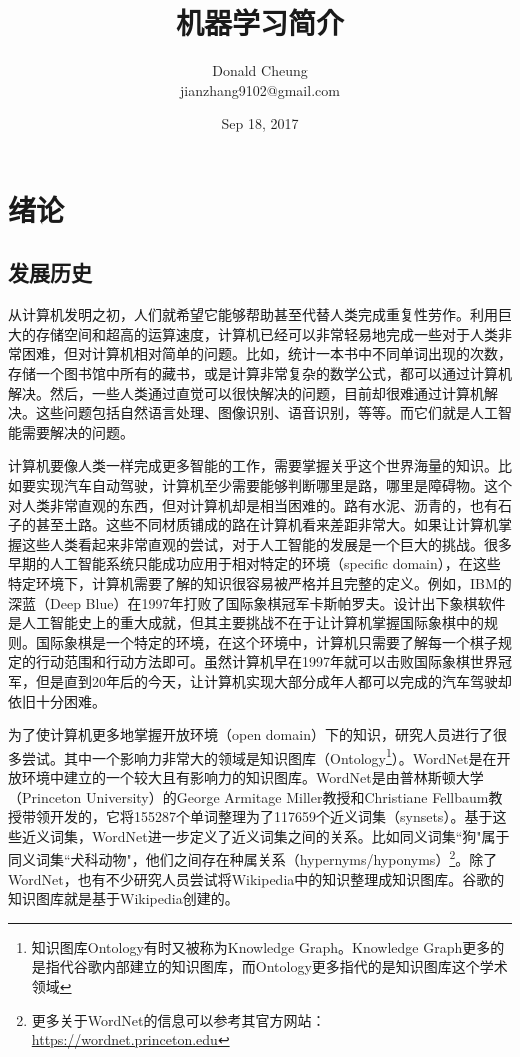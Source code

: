 \documentclass[10pt,a4paper]{ctexbook}
\begin{document}
    \setlength{\baselineskip}{20pt}
    \title{机器学习简介}
    \author{Donald Cheung\\jianzhang9102@gmail.com}
    \date{Sep 18, 2017}
    \maketitle
    \tableofcontents
\fi

\chapter{绪论}
\section{发展历史}
从计算机发明之初，人们就希望它能够帮助甚至代替人类完成重复性劳作。利用巨大的存储空间和超高的运算速度，计算机已经可以非常轻易地完成一些对于人类非常困难，但对计算机相对简单的问题。比如，统计一本书中不同单词出现的次数，存储一个图书馆中所有的藏书，或是计算非常复杂的数学公式，都可以通过计算机解决。然后，一些人类通过直觉可以很快解决的问题，目前却很难通过计算机解决。这些问题包括自然语言处理、图像识别、语音识别，等等。而它们就是人工智能需要解决的问题。

计算机要像人类一样完成更多智能的工作，需要掌握关乎这个世界海量的知识。比如要实现汽车自动驾驶，计算机至少需要能够判断哪里是路，哪里是障碍物。这个对人类非常直观的东西，但对计算机却是相当困难的。路有水泥、沥青的，也有石子的甚至土路。这些不同材质铺成的路在计算机看来差距非常大。如果让计算机掌握这些人类看起来非常直观的尝试，对于人工智能的发展是一个巨大的挑战。很多早期的人工智能系统只能成功应用于相对特定的环境（specific domain），在这些特定环境下，计算机需要了解的知识很容易被严格并且完整的定义。例如，IBM的深蓝（Deep Blue）在1997年打败了国际象棋冠军卡斯帕罗夫。设计出下象棋软件是人工智能史上的重大成就，但其主要挑战不在于让计算机掌握国际象棋中的规则。国际象棋是一个特定的环境，在这个环境中，计算机只需要了解每一个棋子规定的行动范围和行动方法即可。虽然计算机早在1997年就可以击败国际象棋世界冠军，但是直到20年后的今天，让计算机实现大部分成年人都可以完成的汽车驾驶却依旧十分困难。

为了使计算机更多地掌握开放环境（open domain）下的知识，研究人员进行了很多尝试。其中一个影响力非常大的领域是知识图库（Ontology\footnote{知识图库Ontology有时又被称为Knowledge Graph。Knowledge Graph更多的是指代谷歌内部建立的知识图库，而Ontology更多指代的是知识图库这个学术领域}）。WordNet是在开放环境中建立的一个较大且有影响力的知识图库。WordNet是由普林斯顿大学（Princeton University）的George Armitage Miller教授和Christiane Fellbaum教授带领开发的，它将155287个单词整理为了117659个近义词集（synsets）。基于这些近义词集，WordNet进一步定义了近义词集之间的关系。比如同义词集``狗"属于同义词集``犬科动物"，他们之间存在种属关系（hypernyms/hyponyms）\footnote{更多关于WordNet的信息可以参考其官方网站：\url{https://wordnet.princeton.edu}}。除了WordNet，也有不少研究人员尝试将Wikipedia中的知识整理成知识图库。谷歌的知识图库就是基于Wikipedia创建的。
\end{document}
